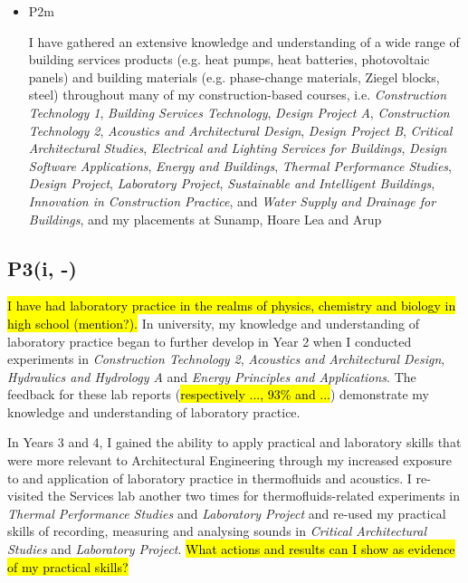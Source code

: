 \begin{itemize}
    \item P2m
    
    I have gathered an extensive knowledge and understanding of a wide range of building services products (e.g. heat pumps, heat batteries, photovoltaic panels) and building materials (e.g. phase-change materials, Ziegel blocks, steel)
    throughout many of my construction-based courses, i.e. 
    \textit{Construction Technology 1},
    \textit{Building Services Technology},
    \textit{Design Project A},
    \textit{Construction Technology 2},
    \textit{Acoustics and Architectural Design},
    \textit{Design Project B},
    \textit{Critical Architectural Studies},
    \textit{Electrical and Lighting Services for Buildings},
    \textit{Design Software Applications},
    \textit{Energy and Buildings},
    \textit{Thermal Performance Studies},
    \textit{Design Project},
    \textit{Laboratory Project},
    \textit{Sustainable and Intelligent Buildings},
    \textit{Innovation in Construction Practice},
    and \textit{Water Supply and Drainage for Buildings},
    and my placements at Sunamp, Hoare Lea and Arup
\end{itemize}





\subsection*{P3(i, -)}

\hl{I have had laboratory practice in the realms of physics, chemistry and biology in high school (mention?).}
In university, my knowledge and understanding of laboratory practice began to further develop in Year 2 when I conducted experiments in \textit{Construction Technology 2}, \textit{Acoustics and Architectural Design}, \textit{Hydraulics and Hydrology A} and \textit{Energy Principles and Applications}.
The feedback for these lab reports (\hl{respectively ..., 93\% and ...}) demonstrate my knowledge and understanding of laboratory practice.

In Years 3 and 4, I gained the ability to apply practical and laboratory skills that were more relevant to Architectural Engineering through my increased exposure to and application of laboratory practice in thermofluids and acoustics.
I re-visited the Services lab another two times for thermofluids-related experiments in \textit{Thermal Performance Studies} and \textit{Laboratory Project} and re-used my practical skills of recording, measuring and analysing sounds in \textit{Critical Architectural Studies} and \textit{Laboratory Project}.
\hl{What actions and results can I show as evidence of my practical skills?}


